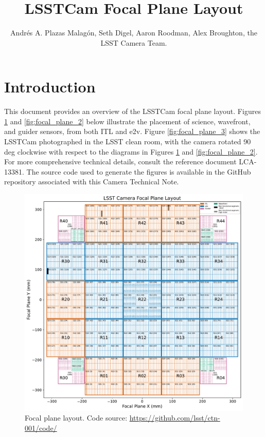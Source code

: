 \documentclass[OPS,lsstdraft,authoryear,toc]{lsstdoc}
\title{LSSTCam Focal Plane Layout}
\author{%
Andrés A. Plazas Malagón, Seth Digel, Aaron Roodman, Alex Broughton, the LSST Camera Team. 
}
\date{\vcsDate}
\begin{document}
\maketitle


\section{Introduction}
This document provides an overview of the LSSTCam focal plane layout.
Figures \ref{fig:focal_plane_1} and \ref{fig:focal_plane_2} below illustrate the placement of science, wavefront, and guider sensors, from both ITL and e2v.
Figure \ref{fig:focal_plane_3} shows the LSSTCam photographed in the LSST clean room, with the camera rotated 90 deg clockwise with respect to the diagrams in Figures \ref{fig:focal_plane_1} and \ref{fig:focal_plane_2}.
For more comprehensive technical details, consult the reference document LCA-13381. 
The source code used to generate the figures is available in the GitHub repository associated with this Camera Technical Note.

\clearpage

\begin{figure}
  \centering
  \includegraphics[width=\textwidth]{figures/LSSTCam_focal_plane_andres_2025MAR03.pdf}
  \caption{Focal plane layout. Code source: \url{https://github.com/lsst/ctn-001/code/}}
  \label{fig:focal_plane_1}
\end{figure}
\end{document}
